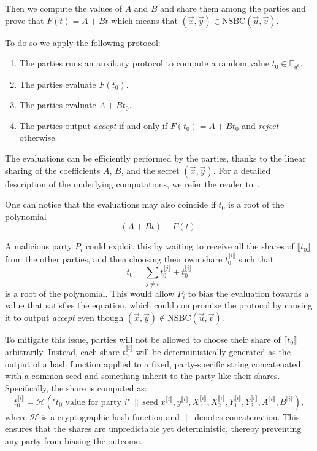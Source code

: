 \documentclass[english]{article}
\newcommand{\lir}{\llbracket i \rrbracket}
\begin{document}
		Then we compute the values of $A$ and $B$ and share them among the parties and prove that $F(t) = A + Bt$ which means that $(\vec{x}, \vec{y}) \in \text{NSBC}(\vec{u}, \vec{v})$.
		
		To do so we apply the following protocol:
		\begin{enumerate}
			\item The parties runs an auxiliary protocol to compute a random value $t_0 \in \mathbb{F}_{q^k}$.
			\item The parties evaluate $F(t_0)$.
			\item The parties evaluate $A + Bt_0$.
			\item The parties output \textit{accept} if and only if $F(t_0) = A + Bt_0$ and \textit{reject} otherwise.
		\end{enumerate}
		
		The evaluations can be efficiently performed by the parties, thanks to the linear sharing of the coefficients $A$, $B$, and the secret $(\vec{x}, \vec{y})$. For a detailed description of the underlying computations, we refer the reader to~\cite{HJ23}.
		
		One can notice that the evaluations may also coincide if $t_0$ is a root of the polynomial
		$$
			(A + Bt) - F(t).
		$$
		
		A malicious party $P_i$ could exploit this by waiting to receive all the shares of $\llbracket t_0 \rrbracket$ from the other parties, and then choosing their own share $t_0^{\lir}$ such that
		$$
			t_0 = \sum_{j \neq i} t_0^{\llbracket j \rrbracket} + t_0^{\lir}
		$$
		is a root of the polynomial. This would allow $P_i$ to bias the evaluation towards a value that satisfies the equation, which could compromise the protocol by causing it to output \textit{accept} even though $(\vec{x}, \vec{y}) \notin \text{NSBC}(\vec{u}, \vec{v})$.
		
		To mitigate this issue, parties will not be allowed to choose their share of $\llbracket t_0 \rrbracket$ arbitrarily. Instead, each share $t_0^{\lir}$ will be deterministically generated as the output of a hash function applied to a fixed, party-specific string concatenated with a common seed and something inherit to the party like their shares. Specifically, the share is computed as:
		$$
		t_0^{\lir} = \mathcal{H}(\text{"}t_0\text{ value for party }i\text{"} \, \| \, \text{seed} | x^{\lir}, y^{\lir}, X_1^{\lir}, X_2^{\lir}, Y_1^{\lir}, Y_2^{\lir}, A^{\lir}, B^{\lir}),
		$$
		where $\mathcal{H}$ is a cryptographic hash function and $\|$ denotes concatenation. This ensures that the shares are unpredictable yet deterministic, thereby preventing any party from biasing the outcome.
		
\end{document}
